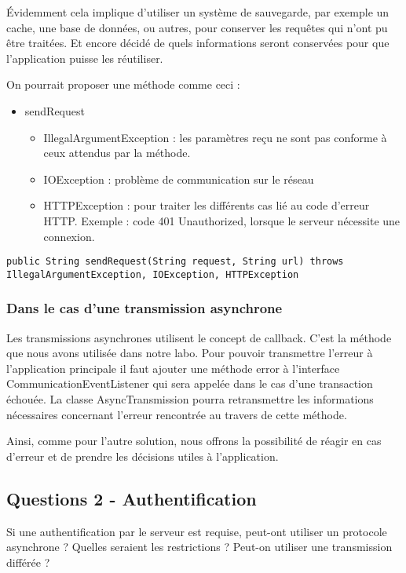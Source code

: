 \documentclass[francais,12pt]{article}
\begin{document}
	Évidemment cela implique d’utiliser un système de sauvegarde, par exemple un cache, une base de données, ou autres, pour conserver les requêtes qui n’ont pu être traitées.  Et encore décidé de quels informations seront conservées pour que l’application puisse les réutiliser.
	
	On pourrait proposer une méthode comme ceci : 
	\begin{itemize}
		\item sendRequest
		\begin{itemize}
			\item IllegalArgumentException : les paramètres reçu ne sont pas conforme à ceux attendus par la méthode.
			\item IOException : problème de communication sur le réseau
			\item HTTPException : pour traiter les différents cas lié au code d'erreur HTTP. Exemple : code 401 Unauthorized, lorsque le serveur nécessite une connexion.
		\end{itemize}
	\end{itemize}
	
	\begin{lstlisting}[style=javaCode]
		public String sendRequest(String request, String url) throws IllegalArgumentException, IOException, HTTPException
	\end{lstlisting}
	
	\subsubsection*{Dans le cas d’une transmission asynchrone}
	Les transmissions asynchrones utilisent le concept de callback. C’est la méthode que nous avons utilisée dans notre labo. Pour pouvoir transmettre l’erreur à l’application principale il faut ajouter une méthode error à l’interface CommunicationEventListener qui sera appelée dans le cas d’une transaction échouée. La classe AsyncTransmission pourra retransmettre les informations nécessaires concernant l’erreur rencontrée au travers de cette méthode. 
	
	Ainsi, comme pour l’autre solution, nous offrons la possibilité de réagir en cas d’erreur et de prendre les décisions utiles à l’application. 
	
	\subsection*{Questions 2 - Authentification}
	Si une authentification par le serveur est requise, peut-ont utiliser un protocole asynchrone ? Quelles seraient les restrictions ? Peut-on utiliser une transmission différée ?
	
\end{document}
